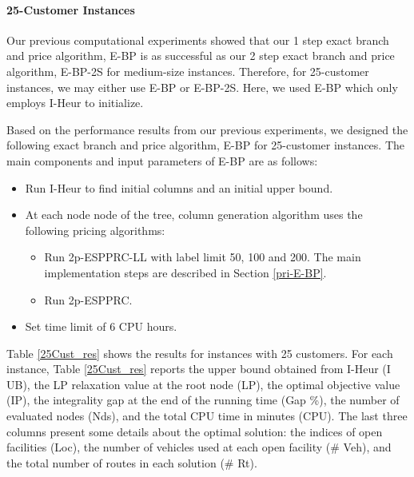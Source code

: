 \paragraph{25-Customer Instances}
Our previous computational experiments showed that our 1 step exact branch and price
algorithm, E-BP is as successful as our 2 step exact branch and price algorithm,
E-BP-2S for medium-size instances. Therefore, for 25-customer instances,
we may either use E-BP or E-BP-2S. Here,  we used E-BP which only
employs I-Heur to initialize.

Based on  the performance results from our previous experiments, we designed the
following exact branch and price algorithm, E-BP for 25-customer instances.
The main components and input parameters of E-BP are as follows:
\begin{itemize}
\item Run I-Heur to find initial columns and an initial upper bound.
\item At each node node of the tree, column generation algorithm
  uses the following pricing algorithms:
  \begin{itemize}
  \item Run 2p-ESPPRC-LL with label limit 50, 100 and 200.
    The main
    implementation steps are described in Section \ref{pri-E-BP}.
  \item Run 2p-ESPPRC.
  \end{itemize}
\item Set time limit of 6 CPU hours.
\end{itemize}

Table \ref{25Cust_res} shows the results for instances  with 25 customers.
For each instance, Table \ref{25Cust_res} reports the upper bound obtained from I-Heur (I UB),
the LP relaxation value at the root node (LP), the optimal objective value (IP),
the integrality gap at the end of the running time (Gap \%), the number of evaluated
nodes (Nds), and the total CPU time in minutes (CPU). The last three columns present
some details about the optimal solution: the indices of open facilities
(Loc), the number of vehicles used at each open facility (\# Veh), and the total number
of routes in each solution (\# Rt).

